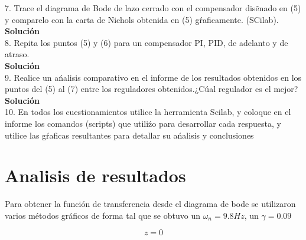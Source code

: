 \documentclass[12pt,letterpaper]{article}
\begin{document}
7. Trace el diagrama de Bode de lazo cerrado con el compensador disẽnado en (5) y comparelo con la
carta de Nichols obtenida en (5) gŕaficamente. (SCilab).\\

\textbf{Solución}\\






8. Repita los puntos (5) y (6) para un compensador PI, PID, de adelanto y de atraso.\\

\textbf{Solución}\\





9. Realice un ańalisis comparativo en el informe de los resultados obtenidos en los puntos del (5) al (7)
entre los reguladores obtenidos.¿Cúal regulador es el mejor?\\

\textbf{Solución}\\



10. En todos los cuestionamientos utilice la herramienta Scilab, y coloque en el informe los comandos (scripts) que utiliźo para desarrollar cada respuesta, y utilice las gŕaficas resultantes para detallar su ańalisis y conclusiones\\

\section{Analisis de resultados}

Para obtener la función de transferencia desde el diagrama de bode se utilizaron varios métodos gráficos de forma tal que se obtuvo un $\omega_n=9.8Hz$, un $\gamma=0.09$

\begin{equation}
    z = 0
    \label{nombre}
\end{equation}


\nocite{*}


\end{document}
